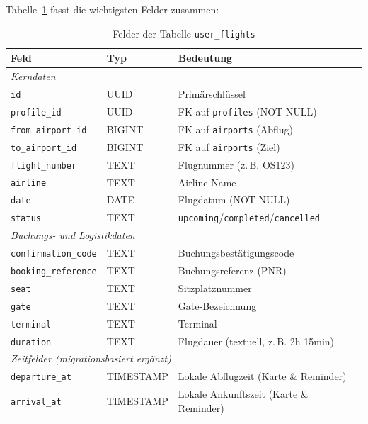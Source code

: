 Tabelle~\ref{tab:user_flights_felder} fasst die wichtigsten Felder zusammen:

\begin{table}[H]
  \centering
  \caption{Felder der Tabelle \texttt{user\_flights}}
  \label{tab:user_flights_felder}
  \begin{tabularx}{\textwidth}{l l X}
    \toprule
    \textbf{Feld} & \textbf{Typ} & \textbf{Bedeutung} \\
    \midrule
    \multicolumn{3}{l}{\textit{Kerndaten}} \\
    \midrule
    \texttt{id}                & UUID    & Primärschlüssel \\
    \texttt{profile\_id}       & UUID    & FK auf \texttt{profiles} (NOT NULL) \\
    \texttt{from\_airport\_id} & BIGINT  & FK auf \texttt{airports} (Abflug) \\
    \texttt{to\_airport\_id}   & BIGINT  & FK auf \texttt{airports} (Ziel) \\
    \texttt{flight\_number}    & TEXT    & Flugnummer (z.\,B. OS123) \\
    \texttt{airline}           & TEXT    & Airline-Name \\
    \texttt{date}              & DATE    & Flugdatum (NOT NULL) \\
    \texttt{status}            & TEXT    & \texttt{upcoming}/\texttt{completed}/\texttt{cancelled} \\
    \midrule
    \multicolumn{3}{l}{\textit{Buchungs- und Logistikdaten}} \\
    \midrule
    \texttt{confirmation\_code}& TEXT    & Buchungsbestätigungscode \\
    \texttt{booking\_reference}& TEXT    & Buchungsreferenz (PNR) \\
    \texttt{seat}              & TEXT    & Sitzplatznummer \\
    \texttt{gate}              & TEXT    & Gate-Bezeichnung \\
    \texttt{terminal}          & TEXT    & Terminal \\
    \texttt{duration}          & TEXT    & Flugdauer (textuell, z.\,B. 2h 15min) \\
    \midrule
    \multicolumn{3}{l}{\textit{Zeitfelder (migrationsbasiert ergänzt)}} \\
    \midrule
    \texttt{departure\_at}     & TIMESTAMP & Lokale Abflugzeit (Karte \& Reminder) \\
    \texttt{arrival\_at}       & TIMESTAMP & Lokale Ankunftszeit (Karte \& Reminder) \\

\end{tabularx}
\end{table}
